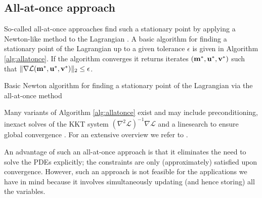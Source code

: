 \documentclass{iopart}
\begin{document}
\subsection{All-at-once approach}
So-called all-at-once approaches find such a stationary point by applying a Newton-like method to the Lagrangian \cite{Haber2000,Haber2001}. A basic algorithm for finding a stationary point of the Lagrangian up to a given tolerance $\epsilon$ is given in Algorithm \ref{alg:allatonce}. If the algorithm converges it returns iterates $(\mathbf{m}^*,\mathbf{u}^*,\mathbf{v}^*)$ such that $\|\nabla \mathcal{L}(\mathbf{m}^*,\mathbf{u}^*,\mathbf{v}^*)\|_2\leq \epsilon$.
%
\begin{algorithm}
\caption{Basic Newton algorithm for finding a stationary point of the Lagrangian via the all-at-once method}
\label{alg:allatonce}
\begin{algorithmic}
\vspace{1mm}
\vspace{1mm}
\STATE{determine steplength $\alpha^k \in (0,1]$}
\vspace{1mm}
\vspace{1mm}
\vspace{1mm}
\ENDWHILE
\end{algorithmic}
\end{algorithm}
%
Many variants of Algorithm \ref{alg:allatonce} exist and may include preconditioning, inexact solves of the KKT system $\left(\nabla^2\mathcal{L}\right)^{-1}\nabla\mathcal{L}$ and a linesearch to ensure global convergence \cite{Haber2001,Biros,Grote2014}. For an extensive overview we refer to \cite{Herzog2010}.

An advantage of such an all-at-once approach is that it eliminates the need to
solve the PDEs explicitly; the constraints are only (approximately) satisfied upon convergence. However, such an approach is not feasible for the applications we have in mind because it involves simultaneously updating (and hence storing) all the variables.
\end{document}
